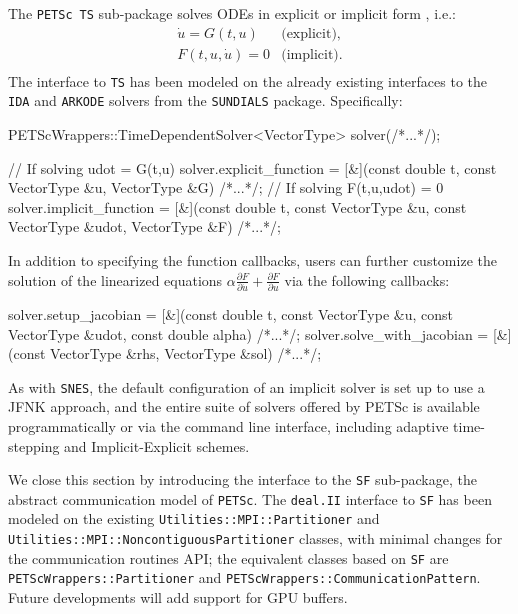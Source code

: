 \documentclass{ansarticle-preprint}
\newcommand{\specialword}[1]{\texttt{#1}}
\newcommand{\dealii}{{\specialword{deal.II}}\xspace}
\newcommand{\petsc}{\specialword{PETSc}\xspace}
\newcommand{\snes}{{\specialword{SNES}}\xspace}
\newcommand{\ts}{{\specialword{TS}}\xspace}
\newcommand{\petscsf}{{\specialword{SF}}\xspace}
\newcommand{\sundials}{{\specialword{SUNDIALS}}\xspace}
\newcommand{\ida}{{\specialword{IDA}}\xspace}
\newcommand{\arkode}{{\specialword{ARKODE}}\xspace}
\begin{document}
The \petsc~\ts sub-package solves ODEs in explicit or implicit form \cite{abhyankar2018petsc}, i.e.:
\begin{eqnarray*}
\dot{u} = G(t,u) &\text{(explicit)},\\
F(t,u,\dot{u}) = 0 &\text{(implicit)}.\\
\end{eqnarray*}
The interface to \ts has been modeled on the already existing interfaces
to the \ida and \arkode solvers from the \sundials package. Specifically:
\begin{c++}
PETScWrappers::TimeDependentSolver<VectorType> solver(/*...*/);

// If solving udot = G(t,u)
solver.explicit_function = [&](const double     t,
                               const VectorType &u,
                               VectorType       &G) {/*...*/};
// If solving F(t,u,udot) = 0
solver.implicit_function = [&](const double     t,
                               const VectorType &u,
                               const VectorType &udot,
                               VectorType       &F) {/*...*/};
\end{c++}
In addition to specifying the function callbacks, users can further customize
the solution of the linearized equations $\alpha \frac{\partial{F}}{\partial{\dot{u}}} + \frac{\partial{F}}{\partial{u}}$
via the following callbacks:
\begin{c++}
solver.setup_jacobian = [&](const double     t,
                            const VectorType &u,
                            const VectorType &udot,
                            const double     alpha) {/*...*/};
solver.solve_with_jacobian = [&](const VectorType &rhs,
                                 VectorType       &sol) {/*...*/};
\end{c++}
As with \snes, the default configuration of an implicit solver is set up to
use a JFNK approach, and the entire suite of solvers offered by PETSc is available
programmatically or via the command line interface,
including adaptive time-stepping and Implicit-Explicit schemes.

We close this section by introducing the interface to the \petscsf sub-package,
the abstract communication model of \petsc. The \dealii interface to
\petscsf has been modeled on the existing \texttt{Utilities::MPI::Partitioner} and
\texttt{Utilities::MPI::NoncontiguousPartitioner} classes, with minimal changes for the
communication routines API; the equivalent classes based
on \petscsf are \texttt{PETScWrappers::Partitioner} and
\texttt{PETScWrappers::CommunicationPattern}.
Future developments will add support for GPU buffers.
\end{document}
